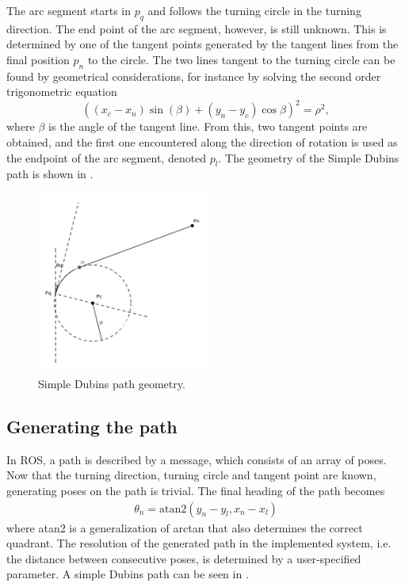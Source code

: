 The arc segment starts in $p_q$ and follows the turning circle in the turning direction. The end point of the arc segment, however, is still unknown. This is determined by one of the tangent points generated by the tangent lines from the final position $p_n$ to the circle. The two lines tangent to the turning circle can be found by geometrical considerations, for instance by solving the second order trigonometric equation \citep{Scibilia2012}
\begin{equation}
((x_c - x_n)\sin(\beta) + (y_n - y_c)\cos{\beta})^2 = \rho^2,
\end{equation}
where $\beta$ is the angle of the tangent line. From this, two tangent points are obtained, and the first one encountered along the direction of rotation is used as the endpoint of the arc segment, denoted $p_l$. The geometry of the Simple Dubins path is shown in .

\begin{figure}[h!]
	\centering
	\includegraphics[width=0.5\textwidth]{fig/guidance/dubins}
	\caption{Simple Dubins path geometry.}
	\label{fig:dubins_ex}
\end{figure}

\subsection{Generating the path}

In ROS, a path is described by a  message, which consists of an array of poses. Now that the turning direction, turning circle and tangent point are known, generating poses on the path is trivial. The final heading of the path becomes
\begin{align}
	\theta_n = \text{atan2}(y_n - y_l, x_n - x_l)
\end{align}
where atan2 is a generalization of arctan that also determines the correct quadrant. The resolution of the generated path in the implemented system, i.e. the distance between consecutive poses, is determined by a user-specified parameter. A simple Dubins path can be seen in .

